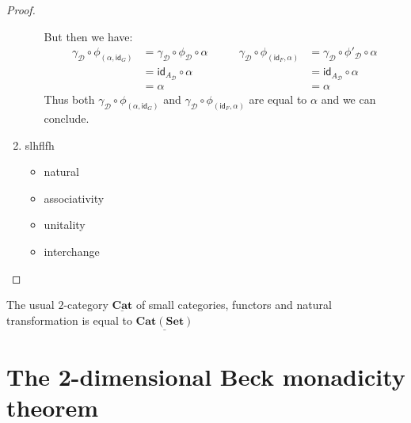 \documentclass[a4paper,UKenglish,cleveref,pdftex,thm-restate,numberwithinsect]{lipics-v2021}
\newcommand{\cat}[1]{\ensuremath{\mathbf{#1}}}
\newcommand{\dcate}[1]{\underline{\mathbf{Cat}(\cat{#1})}}
\newcommand{\dcateg}{\mathbf{\underline{Cat}}}
\newcommand{\id}[1]{\mathsf{id}_{#1}}
\begin{document}
\begin{proof}
\begin{enumerate}
\begin{itemize}
				But then we have:
				\[\begin{split}
				\gamma_{\mathcal{D}}\circ \phi_{(\alpha, \id{G})}&=\gamma_{\mathcal{D}}\circ \phi_{\mathcal{D}}\circ \alpha\\&=\id{A_{\mathcal{D}}}\circ \alpha\\&= \alpha 
				\end{split} \qquad \begin{split}
				\gamma_{\mathcal{D}}\circ \phi_{(\id{F}, \alpha)}&= \gamma_{\mathcal{D}}\circ \phi'_{\mathcal{D}}\circ \alpha\\&=\id{A_{\mathcal{D}}}\circ \alpha \\&= \alpha 
				\end{split}
				\]
				Thus both $\gamma_{\mathcal{D}}\circ \phi_{(\alpha, \id{G})}$ and $\gamma_{\mathcal{D}}\circ \phi_{(\id{F}, \alpha)}$ are equal to $\alpha$ and we can conclude.
			\end{itemize}
			\item  slhflfh
			\begin{itemize}
				\item natural
				\item associativity
				\item unitality
				\item interchange\qedhere 
			\end{itemize}
		\end{enumerate}
	\end{proof}
	
\begin{remark}\label{rem:set}
	The usual $2$-category $\dcateg$ of small categories, functors and natural transformation  is equal to $\dcate{Set}$
\end{remark}
	
	\section{The 2-dimensional Beck monadicity theorem}
	
\end{document}
